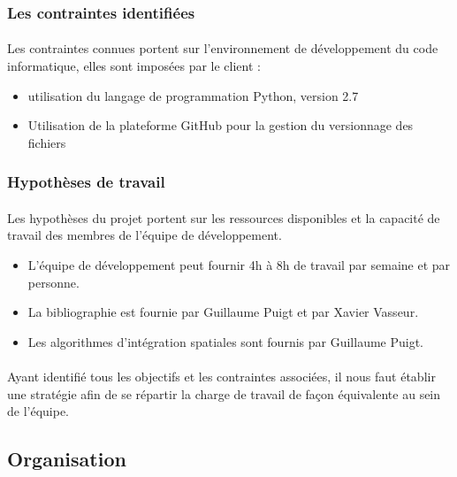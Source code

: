     \subsubsection{Les contraintes identifiées}
        \paragraph{}
        Les contraintes connues portent sur l'environnement de développement du code informatique, elles sont imposées par le client :
        \begin{itemize}
            \item utilisation du langage de programmation Python, version 2.7
            \item Utilisation de la plateforme GitHub pour la gestion du versionnage des fichiers
        \end{itemize}

    \subsubsection{Hypothèses de travail}
        \paragraph{}
        Les hypothèses du projet portent sur les ressources disponibles et la capacité de travail des membres de l'équipe de développement.
        \begin{itemize}
            \item L'équipe de développement peut fournir 4h à 8h de travail par semaine et par personne.
            \item La bibliographie est fournie par Guillaume Puigt et par Xavier Vasseur.
            \item Les algorithmes d'intégration spatiales sont fournis par Guillaume Puigt.
        \end{itemize}

        \paragraph{}
        Ayant identifié tous les objectifs et les contraintes associées, il nous faut établir une stratégie afin de se répartir la charge de travail de façon équivalente au sein de l'équipe.


\subsection{Organisation}

